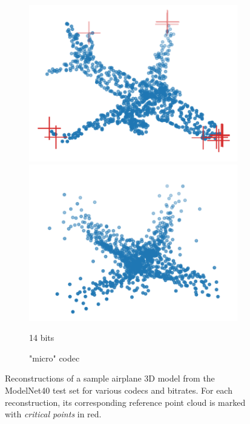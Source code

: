 \begin{figure}[t]
\begin{subfigure}[b]{\subfigureouterhspace}
\begin{subsubfigure}[b]{\subfigurehspace}
      \includegraphics[width=\linewidth]{img/point_cloud_compression/crit/test_airplane_0630/micro_1.pdf}
      \includegraphics[width=\linewidth]{img/point_cloud_compression/rec/test_airplane_0630/micro_1.pdf}
      \caption{14 bits}
      \label{fig:rec/micro/1}
    \end{subsubfigure}%
    \caption{"micro" codec}
  \end{subfigure}%
  \caption{
    Reconstructions of a sample airplane 3D model from the ModelNet40 test set for various codecs and bitrates.
    For each reconstruction, its corresponding reference point cloud is marked with \emph{critical points} in red.
  }
  \label{fig:rec}
\end{figure}




